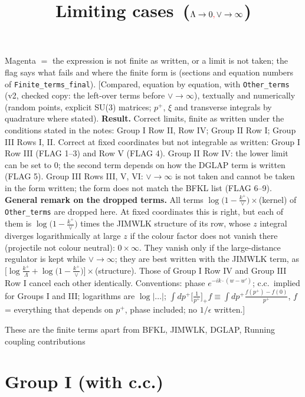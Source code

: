 \documentclass[9pt]{article}
\title{Limiting cases\, ($\Lambda\to 0{\color{red},}\, \vee \to \infty$)}
\author{}
\date{}
\numberwithin{equation}{section}
\begin{document}
\maketitle {\color{red}\noindent[\textbf{Checked copy.} Red $=$ corrected or added (part of the expression); red text in square brackets $=$ notes of the check; orange, struck out $=$ removed.]} {\color{magenta}Magenta  $=$ the expression is not finite as written, or a limit is not taken; the flag says what fails and where the finite form is (sections and equation numbers of \texttt{Finite\_terms\_final}).} {\color{red}[Compared, equation by equation, with \texttt{Other\_terms} (v2, checked copy: the left-over terms before $\vee\to\infty$), textually and numerically (random points, explicit SU(3) matrices; $p^{+}$, $\xi$ and transverse integrals by quadrature where stated). \textbf{Result.} Correct limits, finite as written under the conditions stated in the notes: Group I Row II, Row IV; Group II Row I; Group III Rows I, II. Correct at fixed coordinates but not integrable as written: Group I Row III (FLAG 1--3) and Row V (FLAG 4). Group II Row IV: the lower limit can be set to $0$; the second term depends on how the DGLAP term is written (FLAG 5). Group III Rows III, V, VI: $\vee\to\infty$ is not taken and cannot be taken in the form written; the form does not match the BFKL list (FLAG 6--9). \textbf{General remark on the dropped terms.} All terms $\log\big(1-\frac{k^{+}}{\vee}\big)\times$(kernel) of \texttt{Other\_terms} are dropped here. At fixed coordinates this is right, but each of them is $\log\big(1-\frac{k^{+}}{\vee}\big)$ times the JIMWLK structure of its row, whose $z$ integral diverges logarithmically at large $z$ if the colour factor does not vanish there (projectile not colour neutral): $0\times\infty$. They vanish only if the large-distance regulator is kept while $\vee\to\infty$; they are best written with the JIMWLK term, as $\big[\log\frac{k^{+}}{\Lambda}+\log\big(1-\frac{k^{+}}{\vee}\big)\big]\times$(structure). Those of Group I Row IV and Group III Row I cancel each other identically. Conventions: phase $e^{-ik\cdot(w-w')}$; c.c.\ implied for Groups I and III; logarithms are $\log|\dots|$; $\int dp^{+}\big[\frac{1}{p^{+}}\big]_{+}f\equiv\int dp^{+}\frac{f(p^{+})-f(0)}{p^{+}}$, $f$ = everything that depends on $p^{+}$, phase included; no $1/\epsilon$ written.]}\par
These are the finite terms apart from BFKL, JIMWLK, DGLAP, Running coupling contributions
\section{Group I (with c.c.)}
\end{document}
